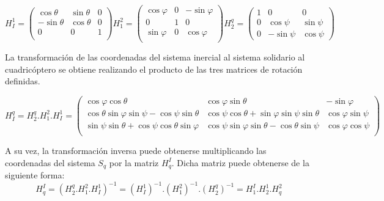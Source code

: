 \documentclass[main]{subfiles}
\begin{document}
\begin{equation}
\label{eq:bases}
H_I^1=\left(\begin{array}{ccc}
  \cos\theta&\sin\theta&0\\
  -\sin\theta&\cos\theta&0\\
  0&0&1\\
  \end{array}\right)   H_1^2=\left(\begin{array}{ccc}
  \cos\varphi&0& -\sin\varphi\\
  0&1&0\\
  \sin\varphi&0&\cos\varphi\\
  
  \end{array}\right)  H_2^q=\left(\begin{array}{ccc}
   1&0&0\\  
  0&\cos\psi&\sin\psi\\
  0&-\sin\psi&\cos\psi  
  
  \end{array}\right) 
\end{equation}



La transformaci\'on de las coordenadas del sistema inercial al sistema solidario al cuadric\'optero se obtiene realizando el producto de las tres matrices de rotaci\'on definidas.

\begin{footnotesize}
\begin{equation}
\label{eq:cambio_base}
H_I^q=H_2^q.H_1^2.H_I^1=\left(\begin{array}{ccc}
\cos\varphi\cos\theta& \cos\varphi\sin\theta& -\sin\varphi\\
 \cos\theta\sin\varphi\sin\psi -\cos\psi\sin\theta &\cos \psi \cos \theta+ \sin\varphi\sin\psi\sin\theta& \cos\varphi\sin\psi\\
\sin\psi\sin\theta + \cos\psi\cos\theta\sin\varphi&  \cos\psi\sin\varphi\sin\theta- \cos\theta\sin\psi & \cos\varphi\cos\psi\\
\end{array} \right)
\end{equation}
\end{footnotesize}
 
 A su vez, la transformaci\'on inversa puede obtenerse multiplicando las coordenadas del sistema $S_q$ por la matriz $H_q^I$. Dicha matriz puede obtenerse de la siguiente forma:
\begin{equation}
\label{eq:quad_to_inertial}
 H_q^I=(H_2^q.H_1^2.H_I^1)^{-1}=(H_I^1)^{-1}.(H_1^2)^{-1}.(H_2^q)^{-1}=H_1^I.H_2^1.H_q^2
 \end{equation}
 
\end{document}

